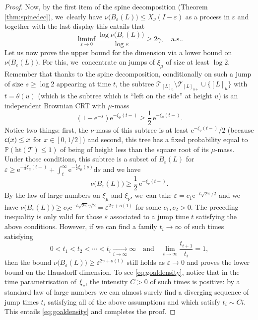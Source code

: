\documentclass[11pt]{article}
\let\dH\gamma
\newcommand{\T}{\mathcal{T}}\let\CRT\T\let\tbr\T
\newcommand{\h}{\mathrm{ht}}
\theoremstyle{definition}
\begin{document}
\begin{proof}
Now, by the first item of the spine decomposition (Theorem \ref{thm:spinedec}), we~clearly have $\nu\big(B_{ \varepsilon }(L)\big) \leq X_\nu(I - \varepsilon)$ as a process in $ \varepsilon$ and together with the last display this entails that
\[
\liminf_{ \varepsilon \to 0} \frac{\log \nu \big(B_\varepsilon(L)\big) }{\log \varepsilon} \geq 2 \dH, \quad \text{a.s.}.
\]
Let us now prove the upper bound for the dimension via a lower bound on $\nu \big(B_\varepsilon(L)\big)$. For this, we~concentrate on jumps of $\xi_\mu$ of size at least $\log 2$. Remember that thanks to the spine decomposition, conditionally on such a jump of size $s\geq \log 2$ appearing at time $t$, the subtree $\T_{[L]_{u}}\setminus \T_{[L]_{u+}} \cup \{[L]_{u}\}$ with $t=\theta(u)$ (which is the subtree which is ``left on the side'' at height $u$) is an independent Brownian CRT with $\mu$-mass
\[
(1- \mathrm{e}^{-s}) \mathrm{e}^{- \xi_\mu(t-)} \geq \frac{1}{2}\, \mathrm{e}^{- \xi_\mu(t-)}.
\]
Notice two things: first, the $\nu$-mass of this subtree is at least $ \mathrm{e}^{- \xi_\nu(t-)}/2$ (because $\mathsf{c}(x) \leq x$ for $x \in [0,1/2]$) and second, this tree has a fixed probability equal to $ \mathbb{P}(\h(\mathcal{T}) \leq 1)$ of being of height less than the square root of its $\mu$-mass. Under those conditions, this subtree is a subset of $B_{ \varepsilon}(L)$ for $\varepsilon \geq \mathrm{e}^{-\frac12 \xi_\mu(t-)} + \int_{t}^\infty \mathrm{e}^{-\frac12 \xi_\mu(s)} \mathrm{d}s$ and we have
\begin{equation} \label{eq:lowerbound12}\nu \big(B_{ \varepsilon}(L)\big) \geq \frac12\, \mathrm{e}^{- \xi_\nu(t-)}.
\end{equation} By the law of large numbers on $\xi_\mu$ and $\xi_\nu$, we~can take $\varepsilon = c_1 \mathrm{e}^{- t \sqrt{2\pi}/2}$ and we have $\nu \big(B_{ \varepsilon}(L)\big) \geq c_2 \mathrm{e}^{- t \sqrt{2\pi} \gamma/2} = \varepsilon^{2\gamma + o(1)}$ for some $c_1,c_2>0$. The preceding inequality is only valid for those $ \varepsilon$ associated to a jump time $t$ satisfying the above conditions. However, if we can find a family $t_i \to \infty$ of such times satisfying
\begin{equation} \label{eq:goaldensity} 0 < t_1 < t_2 < \cdots < t_i \xrightarrow[\textstyle i \to \infty]{} \infty \quad \text{and} \quad\lim_{t \to \infty} \frac{t_{i+1}}{t_i} =1,
\end{equation}
then the bound $\nu \big(B_{ \varepsilon}(L)\big) \geq \varepsilon^{2\gamma + o(1)}$ still holds as $ \varepsilon \to 0$ and proves the lower bound on the Hausdorff dimension. To see \eqref{eq:goaldensity}, notice that in the time parametrisation of~$\xi_\nu$, the intensity $C>0$ of such times is positive: by a standard law of large numbers we can almost surely find a diverging sequence of jump times $t_i$ satisfying all of the above assumptions and which satisfy $t_i \sim C i$. This entails \eqref{eq:goaldensity} and completes the proof.
\end{proof}
\end{document}
